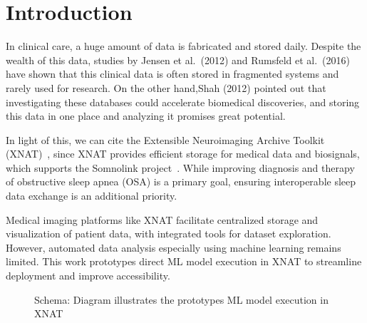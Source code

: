 

\section{Introduction}

In clinical care, a huge amount of data is fabricated and stored daily. Despite the wealth of this data, studies by Jensen et al.~(2012) and Rumsfeld et al.~(2016) have shown that this clinical data is often stored in fragmented systems and rarely used for research. On the other hand,Shah (2012)\cite{jensen_mining_2012,rumsfeld_big_2016,shah_coming_2012} pointed out that investigating these databases could accelerate biomedical discoveries, and storing this data in one place and analyzing it promises great potential.

In light of this, we can cite the Extensible Neuroimaging Archive Toolkit (XNAT)~\cite{marcus_extensible_2007}, since XNAT provides efficient storage for medical data and biosignals, which supports the Somnolink project~\cite{internetredaktion_somnolink_nodate}. While improving diagnosis and therapy of obstructive sleep apnea (OSA) is a primary goal, ensuring interoperable sleep data exchange is an additional priority.

Medical imaging platforms like XNAT facilitate centralized storage and visualization of patient data, with integrated tools for dataset exploration. However, automated data analysis especially using machine learning remains limited. This work prototypes direct ML model execution in XNAT to streamline deployment and improve accessibility.






\begin{figure}[ht]
  \centering
  \def\svgwidth{0.8\linewidth}
  
  \caption{Schema: Diagram illustrates the prototypes ML model execution in XNAT }
  \label{fig:diagram-core-libraries}
\end{figure}


















 

